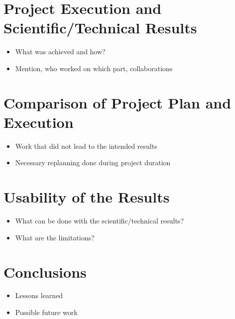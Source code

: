 \documentclass[cover]{ams-project}
\begin{document}
\section{Project Execution and Scientific/Technical Results}
\begin{itemize}
	\item What was achieved and how?
	\item Mention, who worked on which part, collaborations
\end{itemize}


\section{Comparison of Project Plan and Execution}
\begin{itemize}
	\item Work that did not lead to the intended results
	\item Necessary replanning done during project duration
\end{itemize}


\section{Usability of the Results}
\begin{itemize}
	\item What can be done with the scientific/technical results?
	\item What are the limitations?
\end{itemize}


\section{Conclusions}
\begin{itemize}
	\item Lessons learned
	\item Possible future work
\end{itemize}




\authorshipstatement
\end{document}
